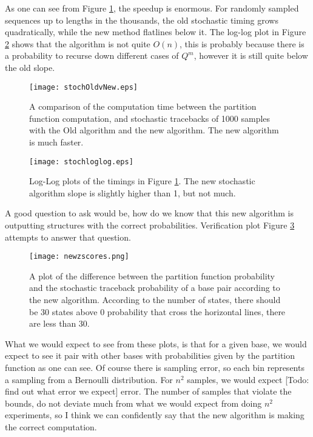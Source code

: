 As one can see from Figure \ref{fig:stochOvN}, the speedup is
enormous. For randomly sampled sequences up to lengths in the
thousands, the old stochastic timing grows quadratically, while the
new method flatlines below it. The log-log plot in Figure
\ref{fig:stochLogLog} shows that the algorithm is not quite $O(n)$,
this is probably because there is a probability to recurse down
different cases of $Q^m$, however it is still quite below the old
slope.
\begin{figure}[t]
\texttt{[image: stochOldvNew.eps]}
\caption{A comparison of the computation time between the partition
  function computation, and stochastic tracebacks of 1000 samples with
  the Old algorithm and the new algorithm. The new algorithm is much
  faster.}
\label{fig:stochOvN}
\end{figure}
\begin{figure}[t]
\texttt{[image: stochloglog.eps]}
\caption{Log-Log plots of the timings in Figure
  \ref{fig:stochOvN}. The new stochastic algorithm slope is slightly
  higher than 1, but not much. }
\label{fig:stochLogLog}
\end{figure}
A good question to ask would be, how do we know that this new
algorithm is outputting structures with the correct
probabilities. Verification plot Figure \ref{fig:stochV} attempts to answer that
question.
\begin{figure}
\texttt{[image: newzscores.png]}
\caption{A plot of the difference between the partition function
  probability and the stochastic traceback probability of a base pair
  according to the new algorithm. According to the number of states,
  there should be 30 states above 0 probability that cross the
  horizontal lines, there are less than 30.}
\label{fig:stochV}
\end{figure}

What we would expect to see from these plots, is that for a given
base, we would expect to see it pair with other bases with
probabilities given by the partition function as one can see. Of
course there is sampling error, so each bin represents a sampling from
a Bernoulli distribution. For $n^2$ samples, we would expect [Todo: find
out what error we expect] error. The number of samples that violate
the bounds, do not deviate much from what we would expect from doing
$n^2$ experiments, so I think we can confidently say that the new
algorithm is making the correct computation.


